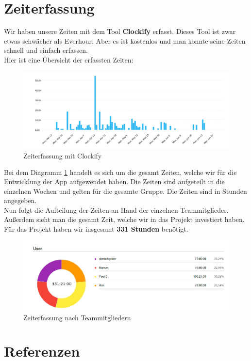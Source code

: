 \documentclass[11pt,a4paper]{article}
\begin{document}
\section{Zeiterfassung}
Wir haben unsere Zeiten mit dem Tool \textbf{Clockify} erfasst. Dieses Tool ist zwar etwas schwächer als Everhour. Aber es ist kostenlos und man konnte seine Zeiten schnell und einfach erfassen.\\
Hier ist eine Übersicht der erfassten Zeiten:
\begin{figure}[h]
    \centering
    \includegraphics[width=\textwidth]{images/clockify_diagram}
    \caption{Zeiterfassung mit Clockify}
    \label{fig:zeiterfassung}
\end{figure}
Bei dem Diagramm \ref{fig:zeiterfassung} handelt es sich um die gesamt Zeiten, welche wir für die Entwicklung der App aufgewendet haben.
Die Zeiten sind aufgeteilt in die einzelnen Wochen und gelten für die gesamte Gruppe. Die Zeiten sind in Stunden angegeben.\\
Nun folgt die Aufteilung der Zeiten an Hand der einzelnen Teammitglieder. Außerdem sieht man die gesamt Zeit, welche wir in das Projekt investiert haben.\\
Für das Projekt haben wir insgesamt \textbf{331 Stunden} benötigt.
\begin{figure}[h]
    \centering
    \includegraphics[width=\textwidth]{images/clockify_piechart}
    \caption{Zeiterfassung nach Teammitgliedern}
    \label{fig:piechart}
\end{figure}
\newpage
\section{Referenzen}
\end{document}
